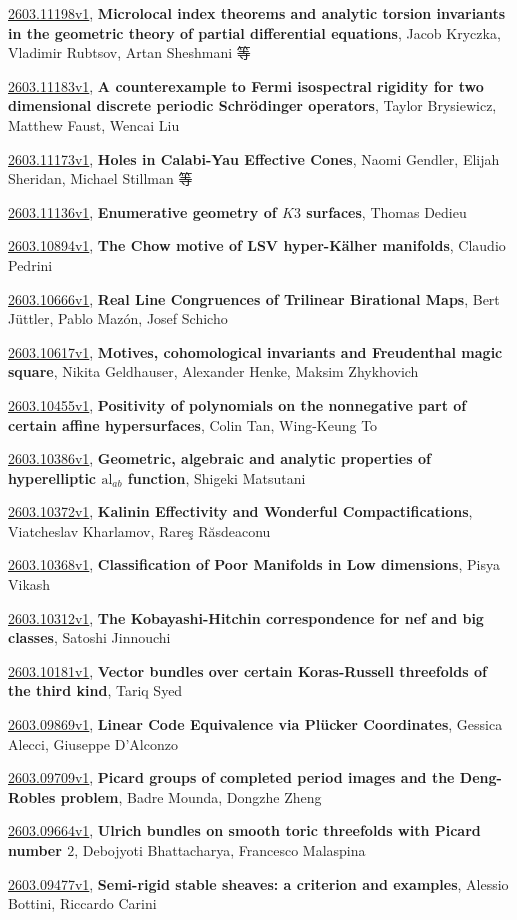 \documentclass[9pt, a4paper]{article}
\theoremstyle{plain}
\theoremstyle{definition}
\theoremstyle{remark}
\newcommand{\arxiv}[3]{\href{https://arxiv.org/abs/#1}{#1}, \textbf{\textcolor{arxivblue}{#2}}, #3}
\begin{document}
\arxiv{2603.11198v1}{Microlocal index theorems and analytic torsion invariants in the geometric theory of partial differential equations}{Jacob Kryczka, Vladimir Rubtsov, Artan Sheshmani 等}

\arxiv{2603.11183v1}{A counterexample to Fermi isospectral rigidity for two dimensional discrete periodic Schrödinger operators}{Taylor Brysiewicz, Matthew Faust, Wencai Liu}

\arxiv{2603.11173v1}{Holes in Calabi-Yau Effective Cones}{Naomi Gendler, Elijah Sheridan, Michael Stillman 等}

\arxiv{2603.11136v1}{Enumerative geometry of $K3$ surfaces}{Thomas Dedieu}

\arxiv{2603.10894v1}{The Chow motive of LSV hyper-Kälher manifolds}{Claudio Pedrini}

\arxiv{2603.10666v1}{Real Line Congruences of Trilinear Birational Maps}{Bert Jüttler, Pablo Mazón, Josef Schicho}

\arxiv{2603.10617v1}{Motives, cohomological invariants and Freudenthal magic square}{Nikita Geldhauser, Alexander Henke, Maksim Zhykhovich}

\arxiv{2603.10455v1}{Positivity of polynomials on the nonnegative part of certain affine hypersurfaces}{Colin Tan, Wing-Keung To}

\arxiv{2603.10386v1}{Geometric, algebraic and analytic properties of hyperelliptic $\mathrm{al}_{ab}$ function}{Shigeki Matsutani}

\arxiv{2603.10372v1}{Kalinin Effectivity and Wonderful Compactifications}{Viatcheslav Kharlamov, Rareş Răsdeaconu}

\arxiv{2603.10368v1}{Classification of Poor Manifolds in Low dimensions}{Pisya Vikash}

\arxiv{2603.10312v1}{The Kobayashi-Hitchin correspondence for nef and big classes}{Satoshi Jinnouchi}

\arxiv{2603.10181v1}{Vector bundles over certain Koras-Russell threefolds of the third kind}{Tariq Syed}

\arxiv{2603.09869v1}{Linear Code Equivalence via Plücker Coordinates}{Gessica Alecci, Giuseppe D'Alconzo}

\arxiv{2603.09709v1}{Picard groups of completed period images and the Deng-Robles problem}{Badre Mounda, Dongzhe Zheng}

\arxiv{2603.09664v1}{Ulrich bundles on smooth toric threefolds with Picard number $2$}{Debojyoti Bhattacharya, Francesco Malaspina}

\arxiv{2603.09477v1}{Semi-rigid stable sheaves: a criterion and examples}{Alessio Bottini, Riccardo Carini}
\end{document}
